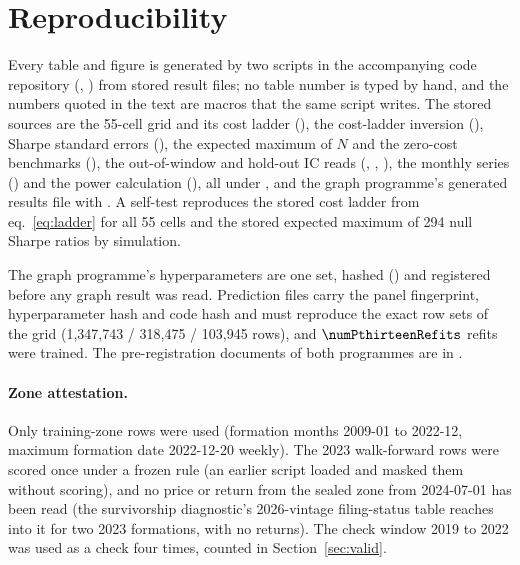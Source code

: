 \section{Reproducibility}\label{app:repro}

Every table and figure is generated by two scripts in the accompanying code repository (, ) from stored result files; no table number is typed by hand, and the numbers quoted in the text are macros that the same script writes. The stored sources are the 55-cell grid and its cost ladder (), the cost-ladder inversion (), Sharpe standard errors (), the expected maximum of $N$ and the zero-cost benchmarks (), the out-of-window and hold-out IC reads (, , ), the monthly series () and the power calculation (), all under , and the graph programme's generated results file  with . A self-test reproduces the stored cost ladder from eq.~\eqref{eq:ladder} for all 55 cells and the stored expected maximum of 294 null Sharpe ratios by simulation.

The graph programme's hyperparameters are one set, hashed () and registered before any graph result was read. Prediction files carry the panel fingerprint, hyperparameter hash and code hash and must reproduce the exact row sets of the grid (1{,}347{,}743 / 318{,}475 / 103{,}945 rows), and $\numPthirteenRefits$ refits were trained. The pre-registration documents of both programmes are in .

\paragraph{Zone attestation.} Only training-zone rows were used (formation months 2009-01 to 2022-12, maximum formation date 2022-12-20 weekly). The 2023 walk-forward rows were scored once under a frozen rule (an earlier script loaded and masked them without scoring), and no price or return from the sealed zone from 2024-07-01 has been read (the survivorship diagnostic's 2026-vintage filing-status table reaches into it for two 2023 formations, with no returns). The check window 2019 to 2022 was used as a check four times, counted in Section~\ref{sec:valid}.
